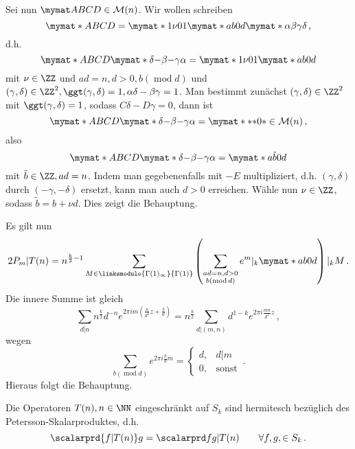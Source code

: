 Sei nun $\mymat ABCD \in \mathcal M (n)$. Wir wollen schreiben
\[
	\mymat* ABCD = \mymat* 1\nu 01 \mymat* ab0d \mymat* \alpha \beta \gamma \delta
	\,,
\]
d.h. 
\[
	\mymat* ABCD \mymat* \delta{-\beta}{-\gamma}\alpha = \mymat* 1\nu 01 \mymat* ab0d
\]
mit $\nu \in \ZZ$ und $ad = n, d > 0, b (\operatorname{mod} d)$ und $(\gamma, \delta) \in \ZZ^2, \ggt(\gamma, \delta) = 1, \alpha\delta - \beta\gamma = 1$. Man bestimmt zunächst $(\gamma, \delta) \in \ZZ^2$ mit $\ggt(\gamma, \delta) = 1$, sodass $C\delta - D\gamma = 0$, dann ist
\[
	\mymat* ABCD \mymat* \delta{-\beta}{-\gamma}\alpha = \mymat* {*}{*}0{*} \in \mathcal M(n)
	\,,
\]
also
\[
	\mymat* ABCD \mymat* \delta{-\beta}{-\gamma}\alpha = \mymat* a{\tilde b}0d 
\]
mit $\tilde b \in \ZZ, ad = n$. Indem man gegebenenfalls mit $-E$ multipliziert, d.h. $(\gamma, \delta)$ durch $(-\gamma, -\delta)$ ersetzt, kann man auch $d > 0$ erreichen. Wähle nun $\nu \in \ZZ$, sodass $\tilde b = b + \nu d$. Dies zeigt die Behauptung.

Es gilt nun
\[
	2 P_m | T(n) = n^{\frac k2 - 1} \sum_{M \in \linksmodulo {\Gamma(1)_\infty}{\Gamma(1)}} \left( \sum_{\substack{ad = n, d > 0 \\ b (\operatorname{mod} d)}} e^m |_k \mymat* ab0d \right) |_k M
	\,.
\]
Die innere Summe ist gleich 
\[
	\sum_{d|n} n^{\frac k2} d^{-n} e^{2\pi im \left( \frac {n}{d^2} z + \frac bd \right)} = n^{\frac k2} \sum_{d | (m,n)} d^{1-k} e^{2\pi i \frac {mn}{d^2} z}
	\,,
\]
wegen 
\[
	\sum_{b (\operatorname{mod} d)} e^{2\pi i \frac bd m} = \begin{cases} d, &d|m \\ 0, &\text{sonst}\end{cases}
	\,.
\]
Hieraus folgt die Behauptung.

\begin{satz}\label{T(n)herm}
Die Operatoren $T(n), n \in \NN$ eingeschränkt auf $S_k$ sind hermitesch bezüglich des Petersson-Skalarproduktes, d.h.
\[
	\scalarprd {f|T(n)}g = \scalarprd f{g|T(n)} \qquad \forall f,g, \in S_k
	\,.
\]
\end{satz}

